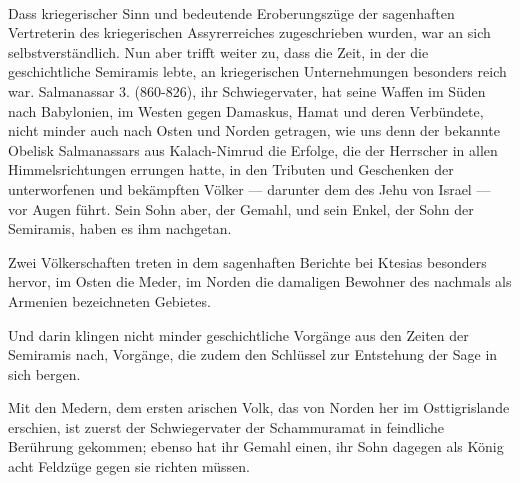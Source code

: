 \documentclass[a4paper, 11pt, oneside, polutonikogreek, german]{article}
\begin{document}
\paragraph{}
Dass kriegerischer Sinn und bedeutende Eroberungszüge der sagenhaften Vertreterin des kriegerischen Assyrerreiches zugeschrieben wurden, war an sich selbstverständlich. Nun aber trifft weiter zu, dass die Zeit, in der die geschichtliche Semiramis lebte, an kriegerischen Unternehmungen besonders reich war. Salmanassar 3. (860-826), ihr Schwiegervater, hat seine Waffen im Süden nach Babylonien, im Westen gegen Damaskus, Hamat und deren Verbündete, nicht minder auch nach Osten und Norden getragen, wie uns denn der bekannte Obelisk Salmanassars aus Kalach-Nimrud die Erfolge, die der Herrscher in allen Himmelsrichtungen errungen hatte, in den Tributen und Geschenken der unterworfenen und bekämpften Völker --- darunter dem des Jehu von Israel --- vor Augen führt. Sein Sohn aber, der Gemahl, und sein Enkel, der Sohn der Semiramis, haben es ihm nachgetan.

Zwei Völkerschaften treten in dem sagenhaften Berichte bei Ktesias besonders hervor, im Osten die Meder, im Norden die damaligen Bewohner des nachmals als Armenien bezeichneten Gebietes.

Und darin klingen nicht minder geschichtliche Vorgänge aus den Zeiten der Semiramis nach, Vorgänge, die zudem den Schlüssel zur Entstehung der Sage in sich bergen.

Mit den Medern, dem ersten arischen Volk, das von Norden her im Osttigrislande erschien, ist zuerst der Schwiegervater der Schammuramat in feindliche Berührung gekommen; ebenso hat ihr Gemahl einen, ihr Sohn dagegen als König acht Feldzüge gegen sie richten müssen.
\end{document}
